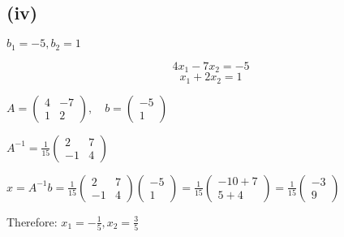 \subsection*{(iv)} $b_1 = -5, b_2 = 1$

\[
	4x_1 - 7x_2 = -5
\]
\[
	x_1 + 2x_2 = 1
\]

$A = \begin{pmatrix}
	4 & -7 \\
	1 & 2
\end{pmatrix}, \quad b = \begin{pmatrix}
	-5 \\
	1
\end{pmatrix}$

$A^{-1} = \frac{1}{15}\begin{pmatrix}
	2 & 7 \\
	-1 & 4
\end{pmatrix}$

$x = A^{-1}b = \frac{1}{15}\begin{pmatrix}
	2 & 7 \\
	-1 & 4
\end{pmatrix}\begin{pmatrix}
	-5 \\
	1
\end{pmatrix} = \frac{1}{15}\begin{pmatrix}
	-10 + 7 \\
	5 + 4
\end{pmatrix} = \frac{1}{15}\begin{pmatrix}
	-3 \\
	9
\end{pmatrix}$

Therefore: $x_1 = -\frac{1}{5}, x_2 = \frac{3}{5}$